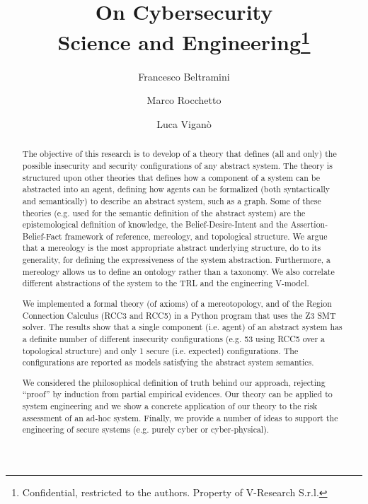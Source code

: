 \documentclass{article}
\date{}                     %
\theoremstyle{definition}
\theoremstyle{corollary}
\theoremstyle{lemma}
\theoremstyle{theorem}
\theoremstyle{theorem}
\begin{document}
\title{On Cybersecurity\\Science and Engineering\footnote{Confidential, restricted to the authors. Property of V-Research S.r.l.}}
\author[1]{Francesco Beltramini}
\author[1]{Marco Rocchetto}
\author[2]{Luca Vigan\`o}

\maketitle

\begin{abstract}
	The objective of this research is to develop of a theory that defines
	(all and only) the possible insecurity and security configurations of
	any abstract system. The theory is structured upon other theories that 
	defines how a component of a system can be abstracted into an agent, defining how
	agents can be formalized (both syntactically and semantically) to
	describe an abstract system, such as a graph. Some of these theories
	(e.g. used for the semantic
	definition of the abstract system) are the epistemological definition
	of knowledge, the Belief-Desire-Intent and the Assertion-Belief-Fact 
	framework of reference, 
	mereology, and topological structure. We argue that a mereology is the
	most appropriate abstract underlying structure, do to its generality,
	for defining the expressiveness of the system abstraction.  Furthermore, a
	mereology allows us to define an ontology rather than a taxonomy.  We
	also correlate different abstractions of the system to the TRL and the
	engineering V-model. 
	
	We implemented a formal theory (of axioms) of a mereotopology, and of
	the Region Connection Calculus (RCC3 and RCC5) in a Python program that
	uses the Z3 SMT solver. The results show that a single component (i.e.
	agent) of an abstract system has a definite number of  different
	insecurity configurations (e.g. 53 using RCC5 over a topological
	structure) and only 1 secure (i.e. expected) configurations. The
	configurations are reported as models satisfying the abstract system
	semantics. 
	
	We considered the philosophical definition of truth behind our
	approach, rejecting ``proof'' by induction from partial empirical evidences.
	Our theory can be applied to system engineering and we show a concrete
	application of our theory to the risk assessment of an ad-hoc system.
	Finally, we provide a number of ideas to support the engineering of
	secure systems (e.g. purely cyber or cyber-physical).
\end{abstract}
\newpage
\end{document}
